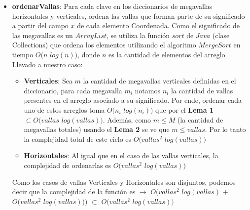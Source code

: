 \begin{itemize}
\begin{itemize}
 \item \textbf{ordenarVallas}: Para cada clave en los diccionarios de megavallas horizontales y verticales, ordena
las vallas que forman parte de su significado a partir del campo $x$ de cada elemento Coordenada. Como
el significado de las megavallas es un $ArrayList$, se utiliza la función $sort$ de $Java$
(clase Collections) que ordena los elementos utilizando el algoritmo $MergeSort$ 
en tiempo $O(n$ $log(n))$, donde $n$ es la cantidad de elementos del arreglo. Llevado a nuestro caso:

\begin{itemize}
 \item \textbf{Verticales}: Sea $m$ la cantidad de megavallas verticales definidas en el diccionario, para cada megavalla $m_{i}$ notamos $n_{i}$  la cantidad de vallas presentes en el arreglo asociado a su significado. Por ende, ordenar cada uno de estos arreglos toma $O(n_i$ $log(n_i))$ que por el \textbf{Lema 1} $\subset O(vallas$ $log(vallas))$. Además, como $m \leq M$ (la cantidad de megavallas totales) usando el \textbf{Lema 2} se ve que $m \leq vallas$. Por lo tanto la complejidad total de este ciclo es $O(vallas^2$ $log(vallas))$

\item \textbf{Horizontales}: Al igual que en el caso de las vallas verticales, la complejidad de ordenarlas es $O(vallas^2$ $log(vallas))$
\end{itemize}

\indent Como los casos de vallas Verticales y Horizontales son disjuntos,
podemos decir que la complejidad de la función es $\rightarrow$ $O(vallas^2$
$log(vallas)$ $+$ $O(vallas^2$ $log(vallas)))$ $\subset$ $O(vallas^2$
$log(vallas))$ 
 
\clearpage
 

\end{itemize}
\end{itemize}

